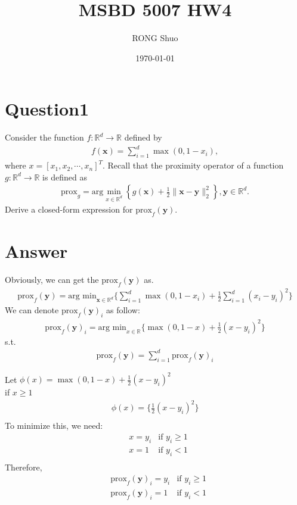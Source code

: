 \documentclass{article}
\title{MSBD 5007 HW4}
\author{RONG Shuo}
\date{\today}
\newcommand{\R}{\mathbb{R}}
\begin{document}
\maketitle

\section*{Question1}
Consider the function \(f: \R^d \to \R\) defined by 
\begin{align*}
    f(\bm{x}) = \sum_{i = 1}^{d}\max(0,1 - x_i),
\end{align*}
where \(x = [x_1, x_2, \cdots, x_n]^T\). Recall that the proximity operator of a function \(g: \R^d \to \R\) is defined as 
\begin{align*}
    \text{prox}_g = \text{arg} \min_{x \in \R^d} \left\{ g(\bm{x}) + \frac{1}{2} \|\bm{x} - \bm{y}\|_2^2\right\}, \bm{y} \in \R^d.
\end{align*}
Derive a closed-form expression for \(\text{prox}_f(\bm{y})\).

\section*{Answer}
Obviously, we can get the \(\text{prox}_f(\bm{y})\) as.
\begin{align*}
    \text{prox}_f(\bm{y}) = \text{arg min}_{\bm{x} \in \R^d} \{ \sum_{i=1}^{d} \max(0, 1 - x_i) + \frac{1}{2} \sum_{i=1}^{d}(x_i - y_i)^2 \}
\end{align*}
We can denote \(\text{prox}_f(\bm{y})_i\) as follow:
\begin{align*}
    \text{prox}_f(\bm{y})_i = \text{arg min}_{x \in \R} \{ \max(0, 1 - x) + \frac{1}{2} (x - y_i)^2 \}
\end{align*}
s.t.
\begin{align*}
    \text{prox}_f(\bm{y}) = \sum_{i=1}^{d} \text{prox}_f(\bm{y})_i
\end{align*}


\noindent
Let \(\phi(x) =  \max(0, 1 - x) + \frac{1}{2} (x - y_i)^2  \) \\
if \(x \geq 1\)
\begin{align*}
    \phi(x) = \{\frac{1}{2} (x - y_i)^2 \} \\
\end{align*}
To minimize this, we need:
\begin{align*}
    &x = y_i &\text{if } y_i \geq 1 \\
    &x = 1        &\text{if } y_i < 1 \\
\end{align*}
Therefore, 
\begin{align*}
    &\text{prox}_f(\bm{y})_i = y_i &\text{if } y_i \geq 1 \\
    &\text{prox}_f(\bm{y})_i = 1 &\text{if } y_i < 1 \\
\end{align*}
\end{document}
